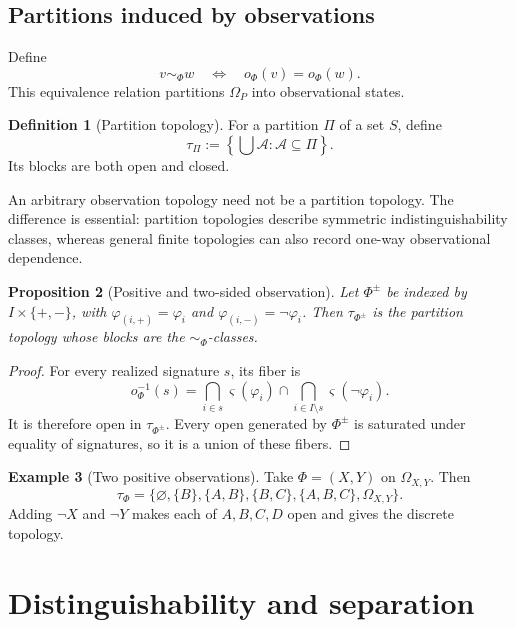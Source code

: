 \documentclass[11pt]{article}
\theoremstyle{definition}
\newtheorem{definition}{Definition}[section]
\newtheorem{example}[definition]{Example}
\theoremstyle{plain}
\newtheorem{proposition}[definition]{Proposition}
\theoremstyle{remark}
\begin{document}
\subsection{Partitions induced by observations}

Define
\[
  v\sim_\Phi w
  \quad\Longleftrightarrow\quad
  o_\Phi(v)=o_\Phi(w).
\]
This equivalence relation partitions $\Omega_P$ into observational states.

\begin{definition}[Partition topology]
For a partition $\Pi$ of a set $S$, define
\[
  \tau_\Pi:=\left\{\bigcup\mathcal A:\mathcal A\subseteq\Pi\right\}.
\]
Its blocks are both open and closed.
\end{definition}

An arbitrary observation topology need not be a partition topology.  The
difference is essential: partition topologies describe symmetric
indistinguishability classes, whereas general finite topologies can also record
one-way observational dependence.

\begin{proposition}[Positive and two-sided observation]\label{prop:two-sided-observation}
Let $\Phi^{\pm}$ be indexed by $I\times\{+,-\}$, with
$\varphi_{(i,+)}=\varphi_i$ and $\varphi_{(i,-)}=\neg\varphi_i$.
Then $\tau_{\Phi^{\pm}}$ is the partition topology whose blocks are the
$\sim_\Phi$-classes.
\end{proposition}

\begin{proof}
For every realized signature $s$, its fiber is
\[
 o_\Phi^{-1}(s)
 =\bigcap_{i\in s}\varsigma(\varphi_i)
  \cap
  \bigcap_{i\in I\setminus s}\varsigma(\neg\varphi_i).
\]
It is therefore open in $\tau_{\Phi^{\pm}}$.  Every open generated by $\Phi^{\pm}$
is saturated under equality of signatures, so it is a union of these fibers.
\end{proof}

\begin{example}[Two positive observations]
Take $\Phi=(X,Y)$ on $\Omega_{X,Y}$.  Then
\[
 \tau_\Phi=
 \{\varnothing,\{B\},\{A,B\},\{B,C\},
   \{A,B,C\},\Omega_{X,Y}\}.
\]
Adding $\neg X$ and $\neg Y$ makes each of $A,B,C,D$ open and gives the
discrete topology.
\end{example}

\section{Distinguishability and separation}
\end{document}
